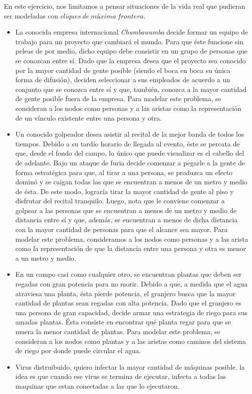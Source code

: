 En este ejercicio, nos limitamos a pensar situaciones de la vida real que pudieran ser modeladas con $cliques\ de\ máxima\ frontera$.
\begin{itemize}

\item La conocida empresa internacional \textit{Chumbawamba} decide formar un equipo de trabajo para un proyecto que cambiará el mundo. Para que éste funcione sin peleas de por medio, dicho equipo debe consistir en un grupo de personas que se conozcan entre sí. Dado que la empresa desea que el proyecto sea conocido por la mayor cantidad de gente posible (siendo el boca en boca su única forma de difusión), deciden seleccionar a sus empleados de acuerdo a un conjunto que se conozca entre sí y que, también, conozca a la mayor cantidad de gente posible fuera de la empresa. Para modelar este problema, se consideran a los nodos como personas y a las aristas como la representación de un vínculo existente entre una persona y otra.

\item Un conocido golpeador desea asistir al recital de la mejor banda de todos los tiempos. Debido a su tardío horario de llegada al evento, éste se percata de que, desde el fondo del campo, lo único que puede visualizar es el cabello del de adelante. Bajo un ataque de furia decide comenzar a pegarle a la gente de forma estratégica para que, al tirar a una persona, se produzca un efecto dominó y se caigan todas las que se encuentran a menos de un metro y medio de ésta. De este modo, lograría tirar la mayor cantidad de gente al piso y disfrutar del recital tranquilo. Luego, nota que le conviene comenzar a golpear a las personas que se encuentran a menos de un metro y medio de distancia entre sí y que, además, se encuentran a menos de dicha distancia con la mayor cantidad de personas para que el alcance sea mayor. Para modelar este problema, consideramos a los nodos como personas y a las arista como la representación de que la distancia entre una persona y otra es menor a un metro y medio.  

 
\item En un campo casi como cualquier otro, se encuentran plantas que deben ser regadas con gran potencia para no morir. Debido a que, a medida que el agua atraviesa una planta, ésta pierde potencia, el granjero busca que la mayor cantidad de plantas sean regadas con alta potencia. Dado que el granjero es una persona de gran capacidad, decide armar una estrategia de riego para sus amadas plantas. Ésta consiste en encontrar qué planta regar para que se muera la menor cantidad de plantas. Para modelar este problema, se consideran a los nodos como plantas y a las aristas como caminos del sistema de riego por donde puede circular el agua. %

\item Virus distruibuido, quiero infectar la mayor cantidad de máquinas posible. la idea es que cuando ese virus se termina de ejecutar, infecta a todas las maquinas que estan conectadas a las que lo ejecutaron.

\end{itemize}
